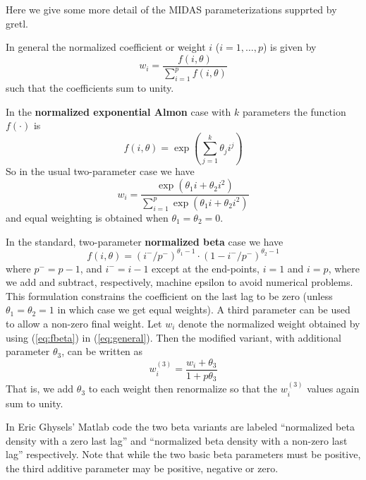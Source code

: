 \documentclass{article}
\begin{document}
Here we give some more detail of the MIDAS parameterizations supprted
by gretl.

\vspace{1ex}

In general the normalized coefficient or weight $i$ ($i=1,\ldots,p$)
is given by
\begin{equation}
\label{eq:general}
  w_i = \frac{f(i,\theta)}
  {\sum_{i=1}^pf(i,\theta)}
\end{equation}
such that the coefficients sum to unity.

In the \textbf{normalized exponential Almon} case with $k$ parameters
the function $f(\cdot)$ is
\begin{equation}
f(i,\theta) = \exp\left(\sum_{j=1}^k \theta_j i^j\right)
\end{equation}
So in the usual two-parameter case we have
\[
w_i =
  \frac{\exp\left(\theta_1 i + \theta_2 i^2\right)}
  {\sum_{i=1}^p \exp\left(\theta_1 i + \theta_2 i^2\right)}
\]
and equal weighting is obtained when $\theta_1 = \theta_2 = 0$.

\vspace{1ex}

In the standard, two-parameter \textbf{normalized beta} case we have
\begin{equation}
\label{eq:fbeta}
  f(i, \theta) = (i^-/p^-)^{\theta_1-1} \cdot (1-i^-/p^-)^{\theta_2-1}
\end{equation}
where $p^- = p-1$, and $i^- = i-1$ except at the end-points, $i=1$
and $i=p$, where we add and subtract, respectively, machine epsilon to
avoid numerical problems.  This formulation constrains the coefficient
on the last lag to be zero (unless $\theta_1 = \theta_2 = 1$ in which
case we get equal weights). A third parameter can be used to allow a
non-zero final weight.  Let $w_i$ denote the normalized weight
obtained by using (\ref{eq:fbeta}) in (\ref{eq:general}). Then the
modified variant, with additional parameter $\theta_3$, can be written
as
\[
w^{(3)}_i = \frac{w_i + \theta_3}{1 + p\theta_3}
\]
That is, we add $\theta_3$ to each weight then renormalize so that the
$w^{(3)}_i$ values again sum to unity.

In Eric Ghysels' Matlab code the two beta variants are labeled
``normalized beta density with a zero last lag'' and ``normalized beta
density with a non-zero last lag'' respectively.  Note that while the
two basic beta parameters must be positive, the third additive
parameter may be positive, negative or zero.

\vspace{1ex}
\end{document}
